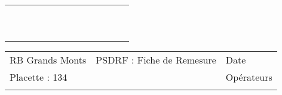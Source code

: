 \documentclass[a4paper, landscape]{article}\usepackage[]{graphicx}\usepackage[]{color}
\begin{document}
{\begin{tabular}{|p{1cm}|p{2cm}|p{1.6cm}|p{1.6cm}|p{1.6cm}|p{1.6cm}|p{1.5cm}|p{1.5cm}|p{1.5cm}|p{1.5cm}|p{1.5cm}|p{7.5cm}|p{5cm}|}
 &  &  &  &  &  &  &  &  &  &  &  &  \\ 
   \hline
 &  &  &  &  &  &  &  &  &  &  &  &  \\ 
   \rowcolor[gray]{0.95} \hline
 &  &  &  &  &  &  &  &  &  &  &  &  \\ 
   \hline
 &  &  &  &  &  &  &  &  &  &  &  &  \\ 
   \rowcolor[gray]{0.95} \hline
 &  &  &  &  &  &  &  &  &  &  &  &  \\ 
   \hline
 &  &  &  &  &  &  &  &  &  &  &  &  \\ 
   \rowcolor[gray]{0.95} \hline
 &  &  &  &  &  &  &  &  &  &  &  &  \\ 
   \hline
 &  &  &  &  &  &  &  &  &  &  &  &  \\ 
   \rowcolor[gray]{0.95} \hline
 &  &  &  &  &  &  &  &  &  &  &  &  \\ 
   \hline
 &  &  &  &  &  &  &  &  &  &  &  &  \\ 
   \rowcolor[gray]{0.95} \hline
 &  &  &  &  &  &  &  &  &  &  &  &  \\ 
   \hline
\end{tabular}
}

\begin{tabular}{p{10cm}p{10cm}p{8cm}}
  RB Grands Monts & PSDRF : Fiche de Remesure & Date \\ 
  Placette : 134 &  & Opérateurs \\ 
   &  &  \\ 
  \end{tabular}
\end{document}
